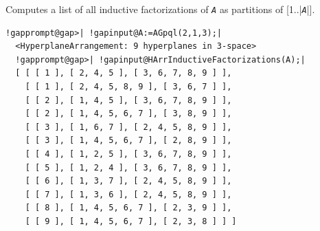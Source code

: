 \documentclass[a4paper,11pt]{report}
\begin{document}
{{{ Computes a list of all inductive factorizations of \mbox{\texttt{\mdseries\slshape A}} as partitions of [1..|\mbox{\texttt{\mdseries\slshape A}}|]. 
\begin{Verbatim}[commandchars=!@|,fontsize=\small,frame=single,label=Example]
  !gapprompt@gap>| !gapinput@A:=AGpql(2,1,3);|
  <HyperplaneArrangement: 9 hyperplanes in 3-space>
  !gapprompt@gap>| !gapinput@HArrInductiveFactorizations(A);|
  [ [ [ 1 ], [ 2, 4, 5 ], [ 3, 6, 7, 8, 9 ] ], 
    [ [ 1 ], [ 2, 4, 5, 8, 9 ], [ 3, 6, 7 ] ], 
    [ [ 2 ], [ 1, 4, 5 ], [ 3, 6, 7, 8, 9 ] ], 
    [ [ 2 ], [ 1, 4, 5, 6, 7 ], [ 3, 8, 9 ] ], 
    [ [ 3 ], [ 1, 6, 7 ], [ 2, 4, 5, 8, 9 ] ], 
    [ [ 3 ], [ 1, 4, 5, 6, 7 ], [ 2, 8, 9 ] ], 
    [ [ 4 ], [ 1, 2, 5 ], [ 3, 6, 7, 8, 9 ] ], 
    [ [ 5 ], [ 1, 2, 4 ], [ 3, 6, 7, 8, 9 ] ], 
    [ [ 6 ], [ 1, 3, 7 ], [ 2, 4, 5, 8, 9 ] ], 
    [ [ 7 ], [ 1, 3, 6 ], [ 2, 4, 5, 8, 9 ] ], 
    [ [ 8 ], [ 1, 4, 5, 6, 7 ], [ 2, 3, 9 ] ], 
    [ [ 9 ], [ 1, 4, 5, 6, 7 ], [ 2, 3, 8 ] ] ]
\end{Verbatim}
 }

 }

 }

   
\end{document}

